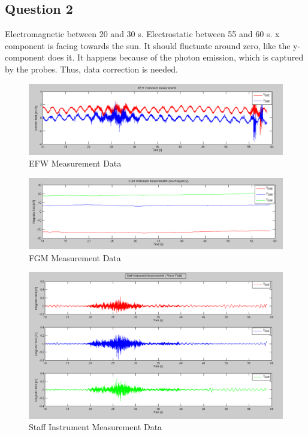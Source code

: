 \documentclass{article}
\begin{document}
\subsection{Question 2}

Electromagnetic between 20 and 30 s. Electrostatic between 55 and 60 s. x component is facing towards the sun. It should fluctuate around zero, like the y-component does it. It happens because of the photon emission, which is captured by the probes. Thus, data correction is needed.

\begin{figure}[htb]
\centering
\includegraphics[width=\textwidth]{Figures/EFW_measurement.png}
\caption{EFW Measurement Data}
\label{fig:EFW}
\end{figure}

\begin{figure}[htb]
\centering
\includegraphics[width=\textwidth]{Figures/FGM_measurement.png}
\caption{FGM Measurement Data}
\label{fig:FGM}
\end{figure}

\begin{figure}[htb!]
\centering
\includegraphics[width=\textwidth]{Figures/Staff_measurement.png}
\caption{Staff Instrument Measurement Data}
\label{fig:Staff}
\end{figure}
\end{document}
